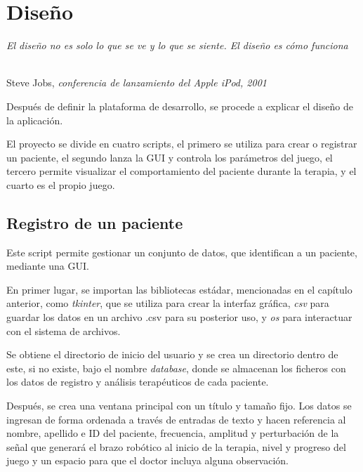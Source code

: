 \chapter{Diseño}
\label{cap:capitulo4}

\begin{flushright}
\begin{minipage}[]{9cm}
\emph{El diseño no es solo lo que se ve y lo que se siente. El diseño es cómo funciona}\\
\end{minipage}\\

Steve Jobs, \textit{conferencia de lanzamiento del Apple iPod, 2001}\\
\end{flushright}

\vspace{1cm}

Después de definir la plataforma de desarrollo, se procede a explicar el diseño de la aplicación.

El proyecto se divide en cuatro scripts, el primero se utiliza para crear o registrar un paciente, el segundo lanza la GUI y controla los parámetros del juego, el tercero permite visualizar el comportamiento del paciente durante la terapia, y el cuarto es el propio juego.

\section{Registro de un paciente}

Este script permite gestionar un conjunto de datos, que identifican a un paciente, mediante una GUI.

En primer lugar, se importan las bibliotecas estádar, mencionadas en el capítulo anterior, como \textit{tkinter}, que se utiliza para crear la interfaz gráfica, \textit{csv} para guardar los datos en un archivo .csv para su posterior uso, y \textit{os} para interactuar con el sistema de archivos.

Se obtiene el directorio de inicio del usuario y se crea un directorio dentro de este, si no existe, bajo el nombre \textit{database}, donde se almacenan los ficheros con los datos de registro y análisis terapéuticos de cada paciente.

Después, se crea una ventana principal con un título y tamaño fijo. Los datos se ingresan de forma ordenada a través de entradas de texto y hacen referencia al nombre, apellido e ID del paciente, frecuencia, amplitud y perturbación de la señal que generará el brazo robótico al inicio de la terapia, nivel y progreso del juego y un espacio para que el doctor incluya alguna observación.

